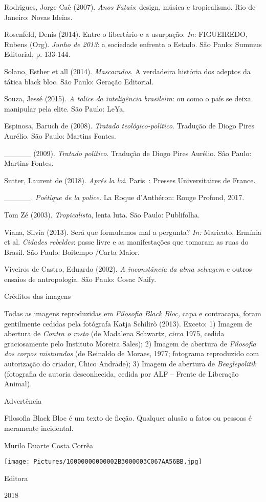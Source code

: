 Rodrigues, Jorge Caê (2007). \emph{Anos Fatais}: design, música e
tropicalismo. Rio de Janeiro: Novas Ideias.

Rosenfeld, Denis (2014). Entre o libertário e a usurpação. \emph{In:
}FIGUEIREDO, Rubens (Org). \emph{Junho de 2013}: a sociedade enfrenta o
Estado. São Paulo: Summus Editorial, p. 133-144.

Solano, Esther et all (2014). \emph{Mascarados}. A verdadeira história
dos adeptos da tática black bloc. São Paulo: Geração Editorial.

Souza, Jessé (2015).\emph{ A tolice da inteligência brasileira}: ou como
o país se deixa manipular pela elite. São Paulo: LeYa.

Espinosa, Baruch de (2008). \emph{Tratado teológico-político}. Tradução
de Diogo Pires Aurélio. São Paulo: Martins Fontes.

\_\_\_\_\_ (2009). \emph{Tratado político}. Tradução de Diogo Pires
Aurélio. Sâo Paulo: Martins Fontes.

Sutter, Laurent de (2018). \emph{Aprés la loi}. Paris~: Presses
Universitaires de France.

\_\_\_\_\_. \emph{Poétique de la police.} La Roque d'Anthéron: Rouge
Profond, 2017.

Tom Zé (2003). \emph{Tropicalista}, lenta luta. São Paulo: Publifolha.

Viana, Silvia (2013). Será que formulamos mal a pergunta? \emph{In:
}Maricato, Ermínia et al. \emph{Cidades rebeldes}: passe livre e as
manifestações que tomaram as ruas do Brasil. São Paulo: Boitempo /Carta
Maior.

Viveiros de Castro, Eduardo (2002). \emph{A inconstância da alma
selvagem }e outros ensaios de antropologia. São Paulo: Cosac Naify.

Créditos das imagens

Todas as imagens reproduzidas em \emph{Filosofia Black Bloc, }capa e
contracapa,\emph{ }foram gentilmente cedidas pela fotógrafa Katja
Schilirò (2013). Exceto: 1) Imagem de abertura de \emph{Contra o rosto}
(de Madalena Schwartz, \emph{circa} 1975, cedida graciosamente pelo
Instituto Moreira Sales); 2) Imagem de abertura de \emph{Filosofia dos
corpos misturados} (de Reinaldo de Moraes, 1977; fotograma reproduzido
com autorização do criador, Chico Andrade); 3) Imagem de abertura de
\emph{Beaglepolitik} (fotografia de autoria desconhecida, cedida por ALF
-- Frente de Liberação Animal).

Advertência

Filosofia Black Bloc é um texto de ficção. Qualquer alusão a fatos ou
pessoas é meramente incidental.

Murilo Duarte Costa Corrêa

\texttt{[image: Pictures/10000000000002B3000003C067AA56BB.jpg]}

Editora

2018
